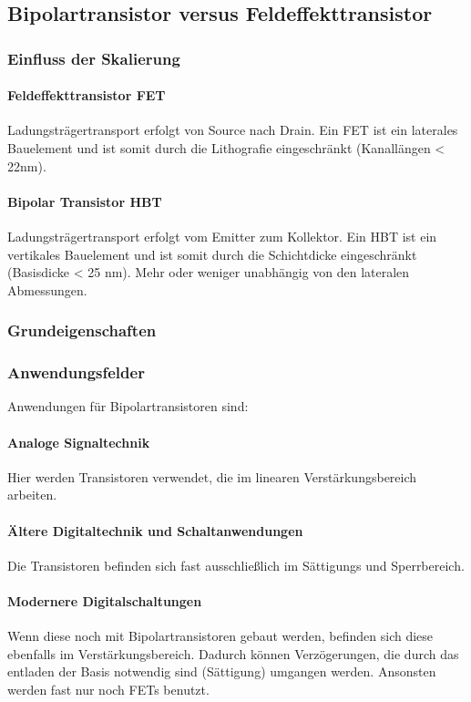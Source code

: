 \subsection{Bipolartransistor versus Feldeffekttransistor}
	\subsubsection{Einfluss der Skalierung}
	\paragraph{Feldeffekttransistor FET}
	Ladungsträgertransport erfolgt von Source
	nach Drain. Ein FET ist ein laterales Bauelement und ist somit durch die Lithografie eingeschränkt (Kanallängen < 22nm).
	\paragraph{Bipolar Transistor HBT}
	Ladungsträgertransport erfolgt vom Emitter
	zum Kollektor. Ein HBT ist ein vertikales Bauelement und ist somit durch die Schichtdicke eingeschränkt (Basisdicke < 25 nm). Mehr oder weniger unabhängig von den lateralen Abmessungen.
	\subsubsection{Grundeigenschaften}
	\subsubsection{Anwendungsfelder}
	Anwendungen für Bipolartransistoren sind:
	\paragraph{Analoge Signaltechnik} Hier werden Transistoren verwendet, die im linearen Verstärkungsbereich arbeiten.
	\paragraph{Ältere Digitaltechnik und Schaltanwendungen} Die Transistoren befinden sich fast ausschließlich  im Sättigungs und Sperrbereich.
	\paragraph{Modernere Digitalschaltungen} Wenn diese noch mit Bipolartransistoren gebaut werden, befinden sich diese ebenfalls im Verstärkungsbereich. Dadurch können Verzögerungen, die durch das entladen der Basis notwendig sind (Sättigung) umgangen werden. Ansonsten werden fast nur noch FETs benutzt. 

